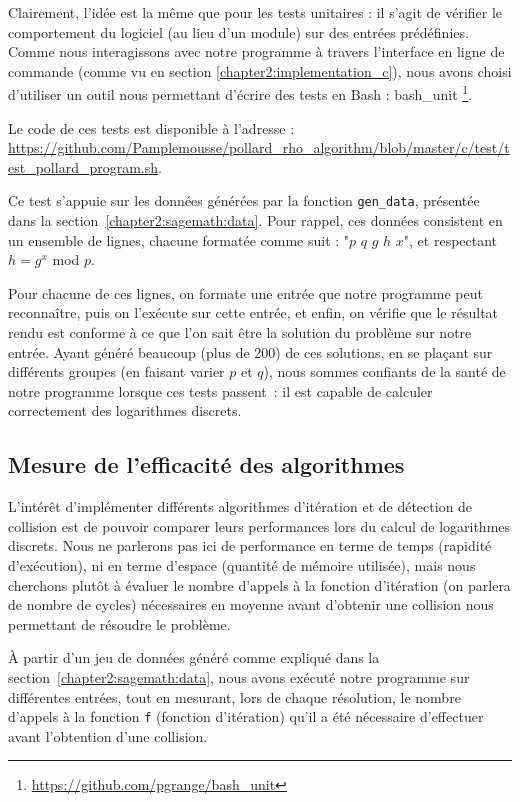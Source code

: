       Clairement, l'idée est la même que pour les tests unitaires : il s'agit de vérifier le comportement du logiciel (au lieu d'un module) sur des entrées prédéfinies. Comme nous interagissons avec notre programme à travers l'interface en ligne de commande (comme vu en section \ref{chapter2:implementation_c}), nous avons choisi d'utiliser un outil nous permettant d'écrire des tests en Bash : bash\_unit \footnote{\url{https://github.com/pgrange/bash_unit}}.

      \begin{sloppypar}
        Le code de ces tests est disponible à l'adresse : \url{https://github.com/Pamplemousse/pollard_rho_algorithm/blob/master/c/test/test_pollard_program.sh}.
      \end{sloppypar}

      Ce test s'appuie sur les données générées par la fonction \lstinline{gen_data}, présentée dans la section~\ref{chapter2:sagemath:data}. Pour rappel, ces données consistent en un ensemble de lignes, chacune formatée comme suit : "$p$ $q$ $g$ $h$ $x$", et respectant $h = g^x$ mod $p$.

      Pour chacune de ces lignes, on formate une entrée que notre programme peut reconnaître, puis on l'exécute sur cette entrée, et enfin, on vérifie que le résultat rendu est conforme à ce que l'on sait être la solution du problème sur notre entrée.
      Ayant généré beaucoup (plus de 200) de ces solutions, en se plaçant sur différents groupes (en faisant varier $p$ et $q$), nous sommes confiants de la santé de notre programme lorsque ces tests passent~: il est capable de calculer correctement des logarithmes discrets.


      \subsection{Mesure de l'efficacité des algorithmes}
      \label{chapter2:protocole_de_mesure}
      L'intérêt d'implémenter différents algorithmes d'itération et de détection de collision est de pouvoir comparer leurs performances lors du calcul de logarithmes discrets. Nous ne parlerons pas ici de performance en terme de temps (rapidité d'exécution), ni en terme d'espace (quantité de mémoire utilisée), mais nous cherchons plutôt à évaluer le nombre d'appels à la fonction d'itération (on parlera de nombre de cycles) nécessaires en moyenne avant d'obtenir une collision nous permettant de résoudre le problème.

      À partir d'un jeu de données généré comme expliqué dans la section~\ref{chapter2:sagemath:data}, nous avons exécuté notre programme sur différentes entrées, tout en mesurant, lors de chaque résolution, le nombre d'appels à la fonction \lstinline{f} (fonction d'itération) qu'il a été nécessaire d'effectuer avant l'obtention d'une collision.

